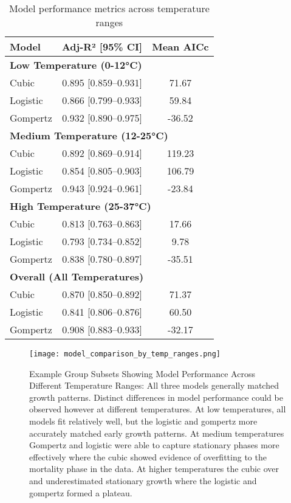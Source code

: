 \documentclass[11pt]{article}
\begin{document}
\begin{table}[htbp]
    \centering
    \caption{Model performance metrics across temperature ranges}
    \label{tab:model_performance}
    \renewcommand{\arraystretch}{1.2}
    \begin{tabular}{lcc}
    \toprule
    \textbf{Model} & \textbf{Adj-R² [95\% CI]} & \textbf{Mean AICc} \\ 
    \midrule
    \multicolumn{3}{l}{\textbf{Low Temperature (0-12°C)}} \\
    Cubic & 0.895 [0.859--0.931] & 71.67 \\
    Logistic & 0.866 [0.799--0.933] & 59.84 \\
    Gompertz & 0.932 [0.890--0.975] & -36.52 \\
    \midrule
    \multicolumn{3}{l}{\textbf{Medium Temperature (12-25°C)}} \\
    Cubic & 0.892 [0.869--0.914] & 119.23 \\
    Logistic & 0.854 [0.805--0.903] & 106.79 \\
    Gompertz & 0.943 [0.924--0.961] & -23.84 \\
    \midrule
    \multicolumn{3}{l}{\textbf{High Temperature (25-37°C)}} \\
    Cubic & 0.813 [0.763--0.863] & 17.66 \\
    Logistic & 0.793 [0.734--0.852] & 9.78 \\
    Gompertz & 0.838 [0.780--0.897] & -35.51 \\
    \midrule
    \multicolumn{3}{l}{\textbf{Overall (All Temperatures)}} \\
    Cubic & 0.870 [0.850--0.892] & 71.37 \\
    Logistic & 0.841 [0.806--0.876] & 60.50 \\
    Gompertz & 0.908 [0.883--0.933] & -32.17 \\
    \bottomrule
    \end{tabular}
\end{table}

\FloatBarrier %

\begin{figure}[htbp]
    \centering
    \texttt{[image: model\_comparison\_by\_temp\_ranges.png]}
    \caption{Example Group Subsets Showing Model Performance Across Different Temperature Ranges: All three models generally matched growth patterns. Distinct differences in model performance could be observed however at different temperatures. At low temperatures, all models fit relatively well, but the logistic and gompertz more accurately matched early growth patterns. At medium temperatures Gompertz and logistic were able to capture stationary phases more effectively where the cubic showed evidence of overfitting to the mortality phase in the data. At higher temperatures the cubic over and underestimated stationary growth where the logistic and gompertz formed a plateau.}
    \label{fig:model_performance}
\end{figure}
\end{document}
